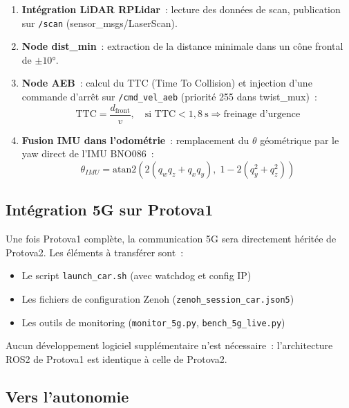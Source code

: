 \documentclass[a4paper,11pt]{article}
\begin{document}
\begin{enumerate}
  \item \textbf{Intégration LiDAR RPLidar}~: lecture des données de scan, publication sur
        \texttt{/scan} (sensor\_msgs/LaserScan).
  \item \textbf{Node dist\_min}~: extraction de la distance minimale dans un cône frontal
        de $\pm 10°$.
  \item \textbf{Node AEB}~: calcul du TTC (Time To Collision) et injection d'une commande
        d'arrêt sur \texttt{/cmd\_vel\_aeb} (priorité 255 dans twist\_mux)~:
        \begin{equation}
          \text{TTC} = \frac{d_{\text{front}}}{v}, \quad \text{si TTC} < 1{,}8\ \text{s}
          \Rightarrow \text{freinage d'urgence}
        \end{equation}
  \item \textbf{Fusion IMU dans l'odométrie}~: remplacement du $\theta$ géométrique
        par le yaw direct de l'IMU BNO086~:
        \begin{equation}
          \theta_{IMU} = \text{atan2}\!\left(2(q_w q_z + q_x q_y),\;
          1 - 2(q_y^2 + q_z^2)\right)
        \end{equation}
\end{enumerate}

\subsection{Intégration 5G sur Protova1}

Une fois Protova1 complète, la communication 5G sera directement héritée de Protova2.
Les éléments à transférer sont~:
\begin{itemize}[noitemsep]
  \item Le script \texttt{launch\_car.sh} (avec watchdog et config IP)
  \item Les fichiers de configuration Zenoh (\texttt{zenoh\_session\_car.json5})
  \item Les outils de monitoring (\texttt{monitor\_5g.py}, \texttt{bench\_5g\_live.py})
\end{itemize}

Aucun développement logiciel supplémentaire n'est nécessaire~: l'architecture
ROS2 de Protova1 est identique à celle de Protova2.

\subsection{Vers l'autonomie}
\end{document}
